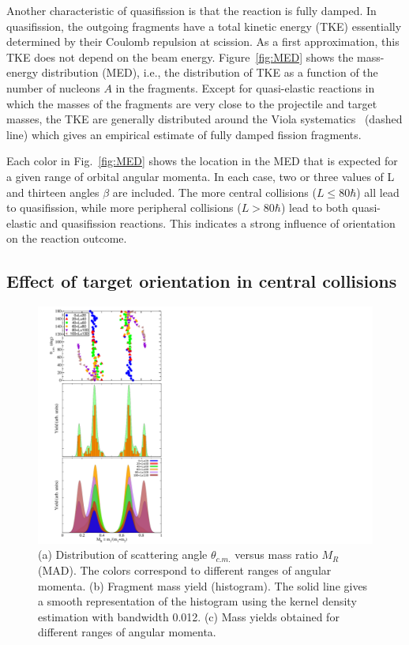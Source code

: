 Another characteristic of quasifission is that the reaction is fully damped.
In quasifission, the outgoing fragments have a total kinetic energy (TKE) essentially determined by their Coulomb repulsion at scission.
As a first approximation, this TKE does not depend on the beam energy.
Figure~\ref{fig:MED} shows the mass-energy distribution (MED), i.e., the distribution of TKE as a function of the number of nucleons $A$ in the fragments.
Except for quasi-elastic reactions in which the masses of the fragments are very close to the projectile and target masses, the TKE are generally distributed around the Viola systematics~\citep{viola1985,hinde1987} (dashed line) which gives an empirical estimate of fully damped fission fragments.

Each color in Fig.~\ref{fig:MED} shows the location in the MED that is expected for a given range of orbital angular momenta. In each case, two or three values of L and thirteen angles $\beta$  are included.
The more central collisions ($L\le80 \hbar$) all lead to quasifission, while more peripheral collisions ($L>80\hbar$) lead to both quasi-elastic and quasifission reactions.
This indicates a strong influence of  orientation on the reaction outcome.

\subsection{Effect of target orientation in central collisions}
\begin{figure}
	\includegraphics*[scale=0.9]{../Figures/CaBk/MAD.pdf}
	\caption{(a) Distribution of scattering angle $\theta_{c.m.}$ versus mass ratio $M_R$ (MAD). The colors correspond to different ranges of angular momenta. (b) Fragment mass yield (histogram). The solid line gives a smooth representation of the histogram using the kernel density estimation with bandwidth 0.012. (c) Mass yields obtained for different ranges of angular momenta.}
	\label{fig:MAD}
\end{figure}

